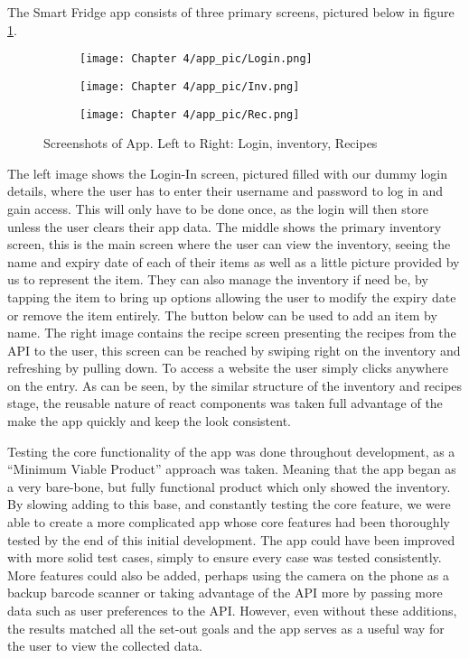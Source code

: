 The Smart Fridge app consists of three primary screens, pictured below in figure \ref{fig:app}.

\begin{figure}[H]
    \begin{subfigure}{.33\textwidth}
      \centering
      \texttt{[image: Chapter 4/app\_pic/Login.png]}
    \end{subfigure}%
    \begin{subfigure}{.33\textwidth}
      \centering
      \texttt{[image: Chapter 4/app\_pic/Inv.png]}
    \end{subfigure}
    \begin{subfigure}{.33\textwidth}
        \centering
        \texttt{[image: Chapter 4/app\_pic/Rec.png]}
    \end{subfigure}
    \caption{Screenshots of App.
Left to Right: Login, inventory, Recipes}
    \label{fig:app}
\end{figure}

The left image shows the Login-In screen, pictured filled with our dummy login details, where the user has to enter their username and password to log in and gain access.
This will only have to be done once, as the login will then store unless the user clears their app data.
The middle shows the primary inventory screen, this is the main screen where the user can view the inventory, seeing the name and expiry date of each of their items as well as a little picture provided by us to represent the item.
They can also manage the inventory if need be, by tapping the item to bring up options allowing the user to modify the expiry date or remove the item entirely.
The button below can be used to add an item by name.
The right image contains the recipe screen presenting the recipes from the API to the user, this screen can be reached by swiping right on the inventory and refreshing by pulling down.
To access a website the user simply clicks anywhere on the entry.
As can be seen, by the similar structure of the inventory and recipes stage, the reusable nature of react components was taken full advantage of the make the app quickly and keep the look consistent.

Testing the core functionality of the app was done throughout development, as a “Minimum Viable Product” approach was taken.
Meaning that the app began as a very bare-bone, but fully functional product which only showed the inventory.
By slowing adding to this base, and constantly testing the core feature, we were able to create a more complicated app whose core features had been thoroughly tested by the end of this initial development.
The app could have been improved with more solid test cases, simply to ensure every case was tested consistently.
More features could also be added, perhaps using the camera on the phone as a backup barcode scanner or taking advantage of the API more by passing more data such as user preferences to the API.
However, even without these additions, the results matched all the set-out goals and the app serves as a useful way for the user to view the collected data.

